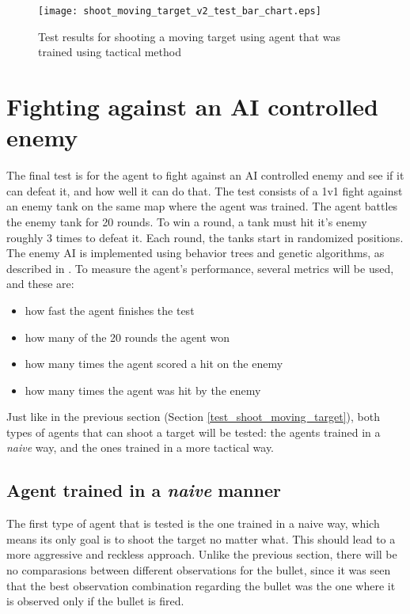 \begin{figure}
    \begin{center}
        \texttt{[image: shoot\_moving\_target\_v2\_test\_bar\_chart.eps]}
        \caption{Test results for shooting a moving target using agent that was trained using tactical method}
        \label{test_results_shoot_moving_target_v2_bar_chart}
    \end{center}
\end{figure}


\section{Fighting against an AI controlled enemy} \label{test_fight_tank}

The final test is for the agent to fight against an AI controlled enemy and see if it can defeat it, and how well it can do that. The test consists of a 1v1 fight against an enemy tank on the same map where the agent was trained. The agent battles the enemy tank for 20 rounds. To win a round, a tank must hit it's enemy roughly 3 times to defeat it. Each round, the tanks start in randomized positions. The enemy AI is implemented using behavior trees and genetic algorithms, as described in \cite{paduraru2019automatic}. To measure the agent's performance, several metrics will be used, and these are:
\begin{itemize}
    \item how fast the agent finishes the test
    \item how many of the 20 rounds the agent won
    \item how many times the agent scored a hit on the enemy
    \item how many times the agent was hit by the enemy
\end{itemize}

Just like in the previous section (Section \ref{test_shoot_moving_target}), both types of agents that can shoot a target will be tested: the agents trained in a \emph{naive} way, and the ones trained in a more tactical way.

\subsection{Agent trained in a \emph{naive} manner}

The first type of agent that is tested is the one trained in a naive way, which means its only goal is to shoot the target no matter what. This should lead to a more aggressive and reckless approach. Unlike the previous section, there will be no comparasions between different observations for the bullet, since it was seen that the best observation combination regarding the bullet was the one where it is observed only if the bullet is fired.

